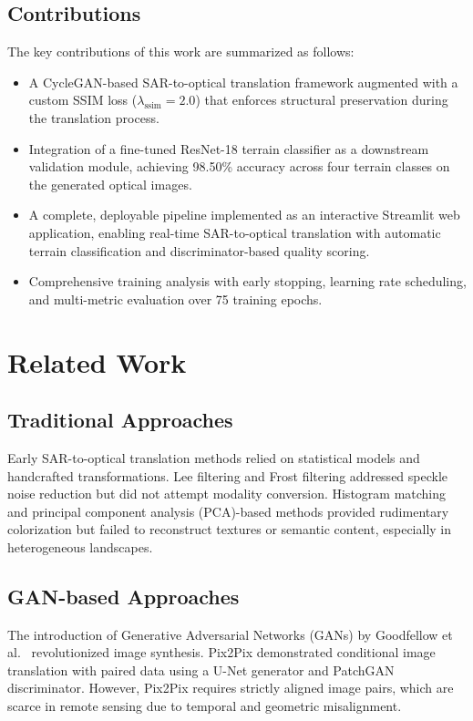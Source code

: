 \documentclass[conference]{IEEEtran}
\begin{document}
\subsection{Contributions}

The key contributions of this work are summarized as follows:
\begin{itemize}
    \item A CycleGAN-based SAR-to-optical translation framework augmented with a custom SSIM loss ($\lambda_{\text{ssim}} = 2.0$) that enforces structural preservation during the translation process.
    \item Integration of a fine-tuned ResNet-18 terrain classifier as a downstream validation module, achieving 98.50\% accuracy across four terrain classes on the generated optical images.
    \item A complete, deployable pipeline implemented as an interactive Streamlit web application, enabling real-time SAR-to-optical translation with automatic terrain classification and discriminator-based quality scoring.
    \item Comprehensive training analysis with early stopping, learning rate scheduling, and multi-metric evaluation over 75 training epochs.
\end{itemize}

\section{Related Work}

\subsection{Traditional Approaches}

Early SAR-to-optical translation methods relied on statistical models and handcrafted transformations. Lee filtering \cite{lee1980} and Frost filtering \cite{frost1982} addressed speckle noise reduction but did not attempt modality conversion. Histogram matching and principal component analysis (PCA)-based methods provided rudimentary colorization \cite{schmitt2018} but failed to reconstruct textures or semantic content, especially in heterogeneous landscapes.

\subsection{GAN-based Approaches}

The introduction of Generative Adversarial Networks (GANs) by Goodfellow et al.\ \cite{goodfellow2014} revolutionized image synthesis. Pix2Pix \cite{isola2017} demonstrated conditional image translation with paired data using a U-Net generator and PatchGAN discriminator. However, Pix2Pix requires strictly aligned image pairs, which are scarce in remote sensing due to temporal and geometric misalignment.
\end{document}
